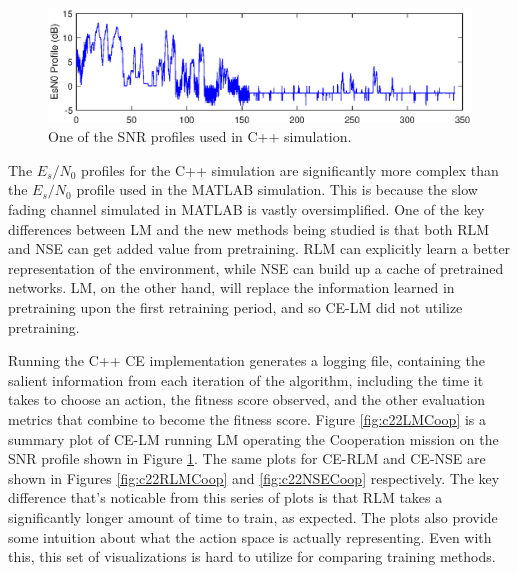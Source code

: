 \begin{figure}[ht]
\centering
\includegraphics[width=\textwidth]{figures/c_sim_results/sim22_SNRProfile.eps}
\caption{One of the SNR profiles used in C++ simulation.}
\label{fig:cSimSNRProfile}
\end{figure}
\par The $E_s/N_0$ profiles for the C++ simulation are significantly more complex than the $E_s/N_0$ profile used in the MATLAB simulation. This is because the slow fading channel simulated in MATLAB is vastly oversimplified. One of the key differences between LM and the new methods being studied is that both RLM and NSE can get added value from pretraining. RLM can explicitly learn a better representation of the environment, while NSE can build up a cache of pretrained networks. LM, on the other hand, will replace the information learned in pretraining upon the first retraining period, and so CE-LM did not utilize pretraining. 
\par Running the C++ CE implementation generates a logging file, containing the salient information from each iteration of the algorithm, including the time it takes to choose an action, the fitness score observed, and the other evaluation metrics that combine to become the fitness score. Figure \ref{fig:c22LMCoop} is a summary plot of CE-LM running LM operating the Cooperation mission on the SNR profile shown in Figure \ref{fig:cSimSNRProfile}. The same plots for CE-RLM and CE-NSE are shown in Figures \ref{fig:c22RLMCoop} and \ref{fig:c22NSECoop} respectively. The key difference that's noticable from this series of plots is that RLM takes a significantly longer amount of time to train, as expected. The plots also provide some intuition about what the action space is actually representing. Even with this, this set of visualizations is hard to utilize for comparing training methods.
